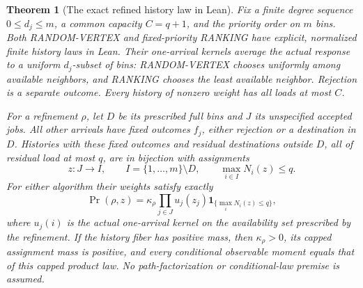 \documentclass[11pt]{article}
\newtheorem{theorem}{Theorem}
\begin{document}
\begin{theorem}[The exact refined history law in Lean]\label{thm:leanhistory}
Fix a finite degree sequence $0\leq d_j\leq m$, a common capacity
$C=q+1$, and the priority order on $m$ bins. Both RANDOM-VERTEX and
fixed-priority RANKING have explicit, normalized finite history laws in
Lean. Their one-arrival kernels average the actual response to a
uniform $d_j$-subset of bins: RANDOM-VERTEX chooses uniformly among
available neighbors, and RANKING chooses the least available neighbor.
Rejection is a separate outcome. Every history of nonzero weight has
all loads at most $C$.

For a refinement $\rho$, let $D$ be its prescribed full bins and $J$ its
unspecified accepted jobs. All other arrivals have fixed outcomes $f_j$,
either rejection or a destination in $D$. Histories with these fixed
outcomes and residual destinations outside $D$, all of residual load at
most $q$, are in bijection with assignments
\[
 z:J\longrightarrow I,\qquad I=\{1,\ldots,m\}\setminus D,
 \qquad \max_{i\in I}N_i(z)\leq q.
\]
For either algorithm their weights satisfy exactly
\[
 \Pr(\rho,z)=\kappa_\rho\prod_{j\in J}u_j(z_j)
               \mathbf1_{\{\max_iN_i(z)\leq q\}},
\]
where $u_j(i)$ is the actual one-arrival kernel on the availability set
prescribed by the refinement. If the history fiber has positive mass,
then $\kappa_\rho>0$, its capped assignment mass is positive, and every
conditional observable moment equals that of this capped product law.
No path-factorization or conditional-law premise is assumed.
\end{theorem}
\end{document}
